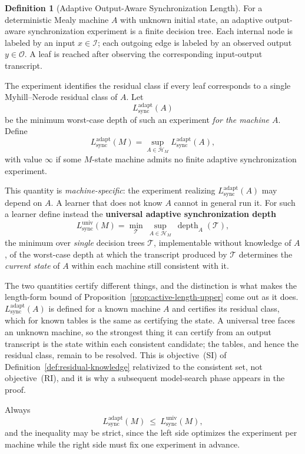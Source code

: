 \documentclass[12pt]{article}
\theoremstyle{definition}
\newtheorem{definition}[theorem]{Definition}
\newcommand{\Lsync}{L_{\mathrm{sync}}^{\mathrm{adapt}}}
\newcommand{\Lsyncu}{L_{\mathrm{sync}}^{\mathrm{univ}}}
\begin{document}
\begin{definition}[Adaptive Output-Aware Synchronization Length]
\label{def:output-aware-sync}
For a deterministic Mealy machine $A$ with unknown initial state, an adaptive
output-aware synchronization experiment is a finite decision tree.  Each
internal node is labeled by an input $x\in\mathcal I$; each outgoing edge is
labeled by an observed output $y\in\mathcal O$.  A leaf is reached after
observing the corresponding input-output transcript.

The experiment identifies the residual class if every leaf corresponds to a
single Myhill--Nerode residual class of $A$.  Let
\[
L_{\mathrm{sync}}^{\mathrm{adapt}}(A)
\]
be the minimum worst-case depth of such an experiment \emph{for the machine
$A$}.  Define
\[
\Lsync(M)
=
\sup_{A\in\mathcal H_M}
L_{\mathrm{sync}}^{\mathrm{adapt}}(A),
\]
with value $\infty$ if some $M$-state machine admits no finite adaptive
synchronization experiment.

This quantity is \emph{machine-specific}: the experiment realizing
$L_{\mathrm{sync}}^{\mathrm{adapt}}(A)$ may depend on $A$.  A learner that does
not know $A$ cannot in general run it.  For such a learner define instead the
\textbf{universal adaptive synchronization depth}
\[
\Lsyncu(M)
=
\min_{\mathcal T}\ \sup_{A\in\mathcal H_M}\ \operatorname{depth}_A(\mathcal T),
\]
the minimum over \emph{single} decision trees $\mathcal T$, implementable
without knowledge of $A$, of the worst-case depth at which the transcript
produced by $\mathcal T$ determines the \emph{current state} of $A$ within each
machine still consistent with it.

The two quantities certify different things, and the distinction is what makes
the length-form bound of Proposition~\ref{prop:active-length-upper} come out as
it does.  $L_{\mathrm{sync}}^{\mathrm{adapt}}(A)$ is defined for a known
machine $A$ and certifies its residual class, which for known tables is the
same as certifying the state.  A universal tree faces an unknown machine, so
the strongest thing it can certify from an output transcript is the state
within each consistent candidate; the tables, and hence the residual class,
remain to be resolved.  This is objective~(SI) of
Definition~\ref{def:residual-knowledge} relativized to the consistent set, not
objective~(RI), and it is why a subsequent model-search phase appears in the
proof.

Always
\[
\Lsync(M)\ \le\ \Lsyncu(M),
\]
and the inequality may be strict, since the left side optimizes the experiment
per machine while the right side must fix one experiment in advance.


\end{definition}
\end{document}
